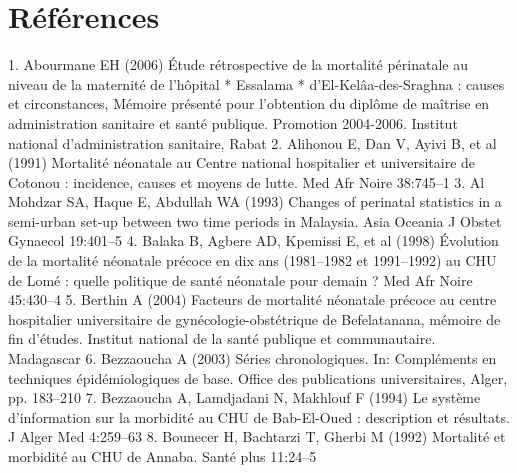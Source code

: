 \section{Références}

1. Abourmane EH (2006) Étude rétrospective de la mortalité
périnatale au niveau de la maternité de l’hôpital * Essalama *
d’El-Kelâa-des-Sraghna : causes et circonstances, Mémoire présenté
pour l’obtention du diplôme de maîtrise en administration
sanitaire et santé publique. Promotion 2004-2006. Institut national
d’administration sanitaire, Rabat
2. Alihonou E, Dan V, Ayivi B, et al (1991) Mortalité néonatale au
Centre national hospitalier et universitaire de Cotonou : incidence,
causes et moyens de lutte. Med Afr Noire 38:745–1
3. Al Mohdzar SA, Haque E, Abdullah WA (1993) Changes of
perinatal statistics in a semi-urban set-up between two time
periods in Malaysia. Asia Oceania J Obstet Gynaecol 19:401–5
4. Balaka B, Agbere AD, Kpemissi E, et al (1998) Évolution de la
mortalité néonatale précoce en dix ans (1981–1982 et 1991–1992)
au CHU de Lomé : quelle politique de santé néonatale pour
demain ? Med Afr Noire 45:430–4
5. Berthin A (2004) Facteurs de mortalité néonatale précoce au
centre hospitalier universitaire de gynécologie-obstétrique de
Befelatanana, mémoire de fin d’études. Institut national de la santé
publique et communautaire. Madagascar
6. Bezzaoucha A (2003) Séries chronologiques. In: Compléments en
techniques épidémiologiques de base. Office des publications
universitaires, Alger, pp. 183–210
7. Bezzaoucha A, Lamdjadani N, Makhlouf F (1994) Le système
d’information sur la morbidité au CHU de Bab-El-Oued :
description et résultats. J Alger Med 4:259–63
8. Bounecer H, Bachtarzi T, Gherbi M (1992) Mortalité et morbidité
au CHU de Annaba. Santé plus 11:24–5	
	

